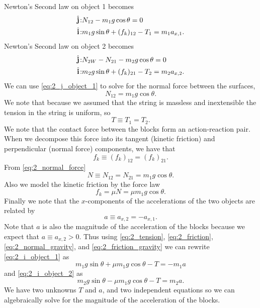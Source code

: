 \documentclass[solutions]{esg8012exam}
\providecommand{\uvec}[1]{{\hat{\bf{#1}}}}
\begin{document}
  Newton's Second law on object 1 becomes
  \begin{align}
    \uvec j\!: & N_{12} - m_1 g \cos\theta = 0 \label{eq:2_j_object_1} \\
    \uvec i\!: & m_1 g \sin\theta + (f_k)_{12} - T_1 = m_1 a_{x,1}. \label{eq:2_i_object_1}
  \end{align}
  Newton's Second law on object 2 becomes
  \begin{align}
    \uvec j\!: & N_{2W} - N_{21} - m_2 g \cos\theta = 0 \label{eq:2_j_object_2} \\
    \uvec i\!: & m_2 g \sin\theta + (f_k)_{21} - T_2 = m_2 a_{x,2}. \label{eq:2_i_object_2}
  \end{align}
  We can use \autoref{eq:2_j_object_1} to solve for the normal force between the surfaces,
  \begin{equation}
    N_{12} = m_1 g \cos\theta. \label{eq:2_normal_force}
  \end{equation}
  We note that because we assumed that the string is massless and inextensible the tension in the string is uniform, so
  \begin{equation}
    T \equiv T_1 = T_2. \label{eq:2_tension}
  \end{equation}
  We note that the contact force between the blocks form an action-reaction pair.  When we decompose this force into its tangent (kinetic friction) and perpendicular (normal force) components, we have that
  \begin{equation}
    f_k \equiv (f_k)_{12} = (f_k)_{21}. \label{eq:2_friction}
  \end{equation}
  From \autoref{eq:2_normal_force}
  \begin{equation}
    N \equiv N_{12} = N_{21} = m_1 g \cos\theta. \label{eq:2_normal_gravity}
  \end{equation}
  Also we model the kinetic friction by the force law
  \begin{equation}
    f_k = \mu N = \mu m_1 g \cos\theta. \label{eq:2_friction_gravity}
  \end{equation}
  Finally we note that the $x$-components of the accelerations of the two objects are related by
  \begin{equation}
    a \equiv a_{x,2} = -a_{x,1}. \label{eq:2_acceleration}
  \end{equation}
  Note that $a$ is also the magnitude of the acceleration of the blocks because we expect that $a \equiv a_{x, 2} > 0$. Thus using \autoref{eq:2_tension}, \autoref{eq:2_friction}, \autoref{eq:2_normal_gravity}, and \autoref{eq:2_friction_gravity} we can rewrite \autoref{eq:2_i_object_1} as
  \begin{equation}
    m_1 g \sin\theta + \mu m_1 g \cos\theta - T = -m_1 a \label{eq:2_rewrite_i_object_1}
  \end{equation}
  and \autoref{eq:2_i_object_2} as
  \begin{equation}
    m_2 g \sin\theta - \mu m_1 g \cos\theta - T = m_2 a. \label{eq:2_rewrite_i_object_2}
  \end{equation}
  We have two unknowns $T$ and $a$, and two independent equations so we can algebraically solve for the magnitude of the acceleration of the blocks.
\end{document}
